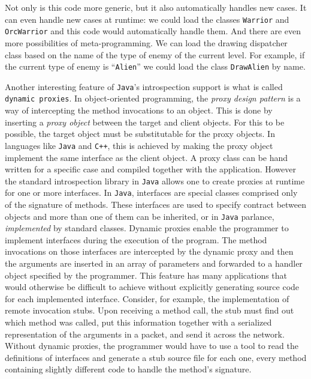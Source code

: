 Not only is this code more generic, but it also automatically handles new cases. It can even handle new cases at runtime: we could load
the classes \texttt{Warrior} and \texttt{OrcWarrior} and this code would automatically handle them. And there are even more possibilities
of meta-programming. We can load the drawing dispatcher class based on the name of the type of enemy of the current level. For example,
if the current type of enemy is ``\texttt{Alien}'' we could load the class \texttt{DrawAlien} by name.

Another interesting feature of \texttt{Java}'s introspection support is what is called \texttt{dynamic proxies}.
In object-oriented programming, the \emph{proxy design pattern} \cite{Gamma} is a way of intercepting the method
invocations to an object. This is done by inserting a \emph{proxy object} between the target and client objects.
For this to be possible, the target object must be substitutable for the proxy objects. In languages like \texttt{Java}
and \texttt{C++}, this is achieved by making the proxy object implement the same interface as the client object. 
A proxy class can be hand written for a specific case and compiled together with the application. However the
standard introspection library in \texttt{Java} allows one to create proxies at runtime for one or more interfaces.
In \texttt{Java}, interfaces are special classes comprised only of the signature of methods. These interfaces are used
to specify contract between objects and more than one of them can be inherited, or in \texttt{Java} parlance,
\emph{implemented} by standard classes. Dynamic proxies enable the programmer to implement interfaces during
the execution of the program. The method invocations on those interfaces are intercepted 
by the dynamic proxy and then the arguments are inserted in an array of parameters and forwarded to a handler object specified
by the programmer. This feature has many applications that would otherwise be difficult to achieve without explicitly generating
source code for each implemented interface. Consider, for example, the implementation of remote invocation stubs. Upon receiving
a method call, the stub must find out which method was called, put this information together with a serialized representation
of the arguments in a packet, and send it across the network. Without dynamic proxies, the programmer would have to use
a tool to read the definitions of interfaces and generate a stub source file for each one, every method containing slightly
different code to handle the method's signature.

